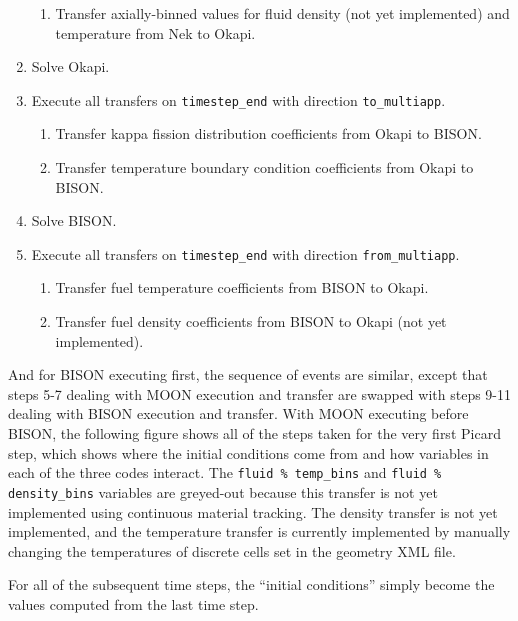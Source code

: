 \documentclass[10pt]{article}
\numberwithin{equation}{section} %
\begin{document}
\begin{enumerate}
\begin{enumerate}
	\item Transfer axially-binned values for fluid density (not yet implemented) and temperature from Nek to Okapi.
	\end{enumerate}
\item Solve Okapi.
\item Execute all transfers on {\tt timestep\_end} with direction {\tt to\_multiapp}.
	\begin{enumerate}
	\item Transfer kappa fission distribution coefficients from Okapi to BISON.
	\item Transfer temperature boundary condition coefficients from Okapi to BISON.
	\end{enumerate}
\item Solve BISON.
\item Execute all transfers on {\tt timestep\_end} with direction {\tt from\_multiapp}.
	\begin{enumerate}
	\item Transfer fuel temperature coefficients from BISON to Okapi.
	\item Transfer fuel density coefficients from BISON to Okapi (not yet implemented).
	\end{enumerate}
\end{enumerate}

And for BISON executing first, the sequence of events are similar, except that steps 5-7 dealing with MOON execution and transfer are swapped with steps 9-11 dealing with BISON execution and transfer. With MOON executing before BISON, the following figure shows all of the steps taken for the very first Picard step, which shows where the initial conditions come from and how variables in each of the three codes interact. The {\tt fluid \% temp\_bins} and {\tt fluid \% density\_bins} variables are greyed-out because this transfer is not yet implemented using continuous material tracking. The density transfer is not yet implemented, and the temperature transfer is currently implemented by manually changing the temperatures of discrete cells set in the geometry XML file.

For all of the subsequent time steps, the ``initial conditions'' simply become the values computed from the last time step.
\end{document}
